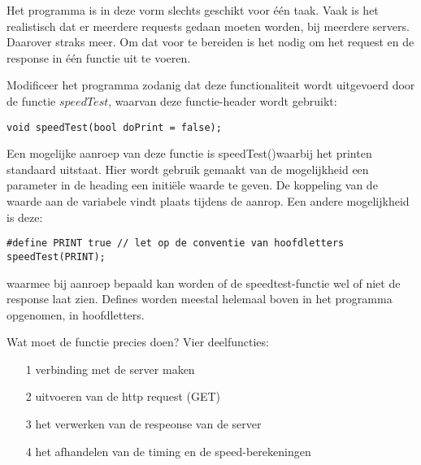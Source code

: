 Het programma is in deze vorm slechts geschikt voor één taak. Vaak is het realistisch dat er meerdere requests gedaan moeten worden, bij meerdere servers. Daarover straks meer. Om dat voor te bereiden is het nodig om het request en de response in één functie uit te voeren.

\begin{exercise}
Modificeer het programma zodanig dat deze functionaliteit wordt uitgevoerd door de functie $speedTest$, waarvan deze functie-header wordt gebruikt:

\begin{lstlisting}[language=Arduino, numbers=none]
void speedTest(bool doPrint = false);
\end{lstlisting}
Een mogelijke aanroep van deze functie is speedTest()waarbij het printen standaard uitstaat. Hier wordt gebruik gemaakt van de mogelijkheid een parameter in de heading een initiële waarde te geven. De koppeling van de waarde aan de variabele vindt plaats tijdens de aanrop. Een andere mogelijkheid is deze:
\begin{lstlisting}[language=Arduino, numbers=none]
#define PRINT true // let op de conventie van hoofdletters 
speedTest(PRINT);
\end{lstlisting}
waarmee bij aanroep bepaald kan worden of de speedtest-functie wel of niet de response laat zien. Defines worden meestal helemaal boven in het programma opgenomen, in hoofdletters.\newline 

Wat moet de functie precies doen? Vier deelfuncties: 
\begin{enumerate}
  \item[1] verbinding met de server maken
  \item[2] uitvoeren van de http request (GET)
  \item[3] het verwerken van de respeonse van de server
  \item[4] het afhandelen van de timing en de speed-berekeningen
\end{enumerate}
\end{exercise}

